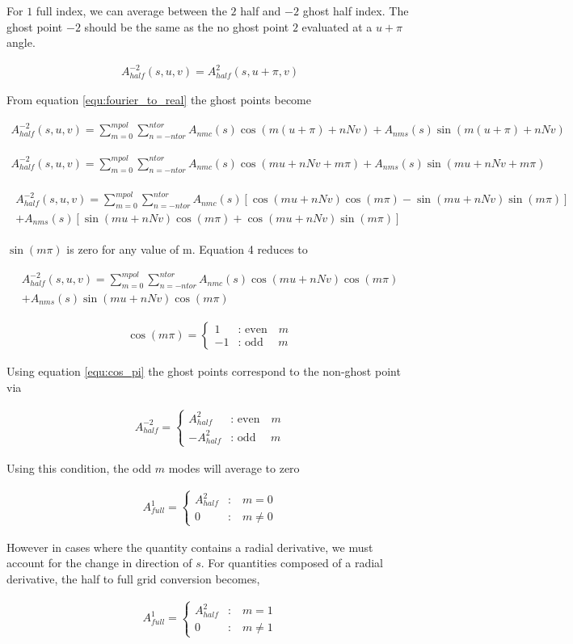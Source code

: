 \documentclass[11pt]{article}
\newcommand{\brackets}[1]{\left(#1\right)}
\newcommand{\sqbrackets}[1]{\left[#1\right]}
\newcommand{\equ}[2]{
	\begin{equation}
    \begin{split}
	#1
	\label{#2}
	\end{split}
	\end{equation}
}
\begin{document}
For $1$ full index, we can average between the $2$ half and $-2$ ghost half index.
The ghost point $-2$ should be the same as the no ghost point $2$ evaluated at a $u+\pi$ angle.
\equ{
A^{-2}_{half}\brackets{s,u,v}=A^{2}_{half}\brackets{s,u+\pi,v}
}{equ:half_ghost}
From equation \ref{equ:fourier_to_real} the ghost points become
\equ{
A^{-2}_{half}\brackets{s,u,v}=\sum^{mpol}_{m=0}\sum^{ntor}_{n=-ntor} A_{nmc}\brackets{s}\cos\brackets{m\brackets{u+\pi}+nNv} + A_{nms}\brackets{s}\sin\brackets{m\brackets{u+\pi}+nNv}
}{equ:half_ghost_2}
\equ{
A^{-2}_{half}\brackets{s,u,v}=\sum^{mpol}_{m=0}\sum^{ntor}_{n=-ntor} A_{nmc}\brackets{s}\cos\brackets{mu+nNv+m\pi} + A_{nms}\brackets{s}\sin\brackets{mu+nNv+m\pi}
}{equ:half_ghost_3}
\equ{
\begin{split}
A^{-2}_{half}\brackets{s,u,v}=\sum^{mpol}_{m=0}\sum^{ntor}_{n=-ntor} A_{nmc}\brackets{s}\sqbrackets{\cos\brackets{mu+nNv}\cos\brackets{m\pi} -\sin\brackets{mu+nNv}\sin\brackets{m\pi}}\\+ A_{nms}\brackets{s}\sqbrackets{\sin\brackets{mu+nNv}\cos\brackets{m\pi}+\cos\brackets{mu+nNv}\sin\brackets{m\pi}}
\end{split}
}{equ:half_ghost_4}
$\sin\brackets{m\pi}$ is zero for any value of m.
Equation 4 reduces to
\equ{
A^{-2}_{half}\brackets{s,u,v}=\sum^{mpol}_{m=0}\sum^{ntor}_{n=-ntor} A_{nmc}\brackets{s}\cos\brackets{mu+nNv}\cos\brackets{m\pi}\\+ A_{nms}\brackets{s}\sin\brackets{mu+nNv}\cos\brackets{m\pi}
}{equ:half_ghost_5}
\equ{
\cos\brackets{m\pi}=\left\{
\begin{array}{ll}
1  & \textrm{: even} \quad m \\
-1 & \textrm{: odd } \quad m
\end{array}
\right.
}{equ:cos_pi}
Using equation \ref{equ:cos_pi} the ghost points correspond to the non-ghost point via
\equ{
A^{-2}_{half}=\left\{
\begin{array}{ll}
A^{2}_{half}  & \textrm{: even} \quad m \\
-A^{2}_{half} & \textrm{: odd } \quad m
\end{array}
\right.
}{half_ghost_relationship}
Using this condition, the odd $m$ modes will average to zero
\equ{
A^{1}_{full}=\left\{
\begin{array}{ll}
A^{2}_{half} & \textrm{:} \quad m=0 \\
0            & \textrm{:} \quad m\ne0
\end{array}
\right.
}{equ:half_to_full_1}
However in cases where the quantity contains a radial derivative, we must account for the change in direction of $s$.
For quantities composed of a radial derivative, the half to full grid conversion becomes,
\equ{
A^{1}_{full}=\left\{
\begin{array}{ll}
A^{2}_{half} & \textrm{:} \quad m=1 \\
0            & \textrm{:} \quad m\ne1
\end{array}
\right.
}{equ:half_to_full_2}
\end{document}
